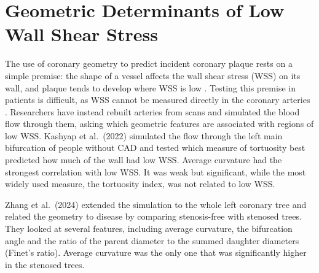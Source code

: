 \section{Geometric Determinants of Low Wall Shear Stress}
\label{sec:lit-wss}

The use of coronary geometry to predict incident coronary plaque rests on a simple premise: the shape
of a vessel affects the wall shear stress (WSS) on its wall, and plaque tends to develop where WSS is
low \cite{chatzizisis2007ess}.
Testing this premise in patients is difficult, as WSS cannot be measured directly in the coronary
arteries \cite{gijsen2019wss}.
Researchers have instead rebuilt arteries from scans and simulated the blood flow through them,
asking which geometric features are associated with regions of low WSS.
Kashyap et al.\ (2022) \cite{kashyap2022tortuosity} simulated the flow through the left main
bifurcation of people without CAD and tested which measure of tortuosity best predicted how much of the wall had low WSS.
Average curvature had the strongest correlation with low WSS. It was weak but significant, while the most widely used measure, the tortuosity index, was not related to low WSS.

Zhang et al.\ (2024) \cite{zhang2024curvature} extended the simulation to the whole left coronary
tree and related the geometry to disease by comparing stenosis-free with stenosed trees.
They looked at several features, including average curvature, the bifurcation angle and the ratio of the parent
diameter to the summed daughter diameters (Finet's ratio).
Average curvature was the only one that was significantly higher in the stenosed trees.

